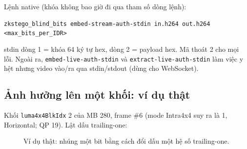 \documentclass[11pt,a4paper]{article}
\begin{document}
Lệnh native (khóa không bao giờ đi qua tham số dòng lệnh):

\begin{center}
\footnotesize
\texttt{zkstego\_blind\_bits embed-stream-auth-stdin in.h264 out.h264 <max\_bits\_per\_IDR>}
\end{center}

stdin dòng 1 = khóa 64 ký tự hex, dòng 2 = payload hex. Mã thoát 2 cho mọi lỗi.
Ngoài ra, \texttt{embed-live-auth-stdin} và \texttt{extract-live-auth-stdin} làm việc
y hệt nhưng video vào/ra qua stdin/stdout (dùng cho WebSocket).

\subsection{Ảnh hưởng lên một khối: ví dụ thật}

Khối \texttt{luma4x4BlkIdx} 2 của MB 280, frame \#6 (mode Intra4x4 suy ra là 1,
Horizontal; QP 19). Lật dấu trailing-one:

\begin{figure}[H]
\centering
{}
\caption{Ví dụ thật: nhúng một bit bằng cách đổi dấu một hệ số trailing-one.}
\label{fig:block-example}
\end{figure}
\end{document}
